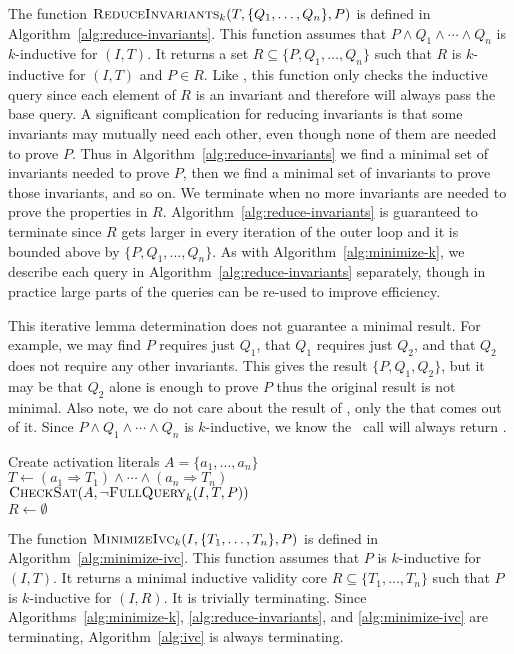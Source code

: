 The function $\textsc{ReduceInvariants}_k(T, \{Q_1, \ldots, Q_n\}, P)$ is defined in
Algorithm~\ref{alg:reduce-invariants}. This function assumes that $P
\land Q_1 \land \cdots \land Q_n$ is $k$-inductive for $(I, T)$. It
returns a set $R \subseteq \{P, Q_1, \ldots, Q_n\}$ such that $R$ is
$k$-inductive for $(I, T)$ and $P \in R$. Like \mink, this function
only checks the inductive query since each element of $R$ is an
invariant and therefore will always pass the base query. A significant
complication for reducing invariants is that some invariants may
mutually need each other, even though none of them are needed to prove
$P$. Thus in Algorithm~\ref{alg:reduce-invariants} we find a minimal
set of invariants needed to prove $P$, then we find a minimal set of
invariants to prove those invariants, and so on. We terminate when no
more invariants are needed to prove the properties in $R$.
Algorithm~\ref{alg:reduce-invariants} is guaranteed to terminate since
$R$ gets larger in every iteration of the outer loop and it is bounded
above by $\{P, Q_1, \ldots, Q_n\}$. As with
Algorithm~\ref{alg:minimize-k}, we describe each query in
Algorithm~\ref{alg:reduce-invariants} separately, though in practice
large parts of the queries can be re-used to improve efficiency.

This iterative lemma determination does not guarantee a minimal
result. For example, we may find $P$ requires just $Q_1$, that $Q_1$
requires just $Q_2$, and that $Q_2$ does not require any other
invariants. This gives the result $\{P, Q_1, Q_2\}$, but it may be
that $Q_2$ alone is enough to prove $P$ thus the original result is
not minimal. Also note, we do not care about the result of \checksat,
only the \unsatcore that comes out of it. Since $P \land Q_1 \land
\cdots \land Q_n$ is $k$-inductive, we know the \checksat\ call will
always return \unsat.

\begin{algorithm}[t]
  Create activation literals $A = \{a_1, \ldots, a_n\}$ \\
  $T \leftarrow (a_1 \Rightarrow T_1) \land \cdots \land (a_n \Rightarrow T_n)$ \\
  $\textsc{CheckSat}(A, \neg\textsc{FullQuery}_k(I, T, P))$ \\
  $R \leftarrow \emptyset$ \\
\caption{$\minivc_k(I, \{T_1, \ldots, T_n\}, P)$}
\label{alg:minimize-ivc}
\end{algorithm}

The function $\minivc_k(I, \{T_1, \ldots, T_n\}, P)$ is defined in
Algorithm~\ref{alg:minimize-ivc}. This function assumes that $P$ is
$k$-inductive for $(I, T)$. It returns a minimal inductive validity
core $R \subseteq \{T_1, \ldots, T_n\}$ such that $P$ is $k$-inductive
for $(I, R)$. It is trivially terminating. Since
Algorithms~\ref{alg:minimize-k}, \ref{alg:reduce-invariants}, and
\ref{alg:minimize-ivc} are terminating, Algorithm~\ref{alg:ivc} is
always terminating.

